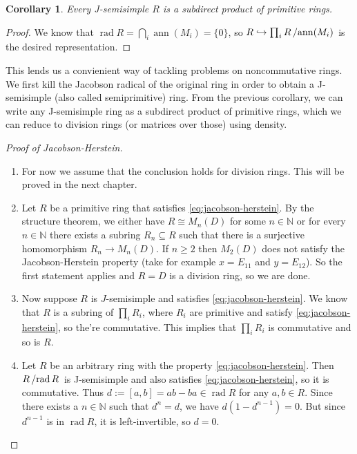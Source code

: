 \documentclass[10pt, a4paper]{article}
\newtheorem{corollary}[thm]{Corollary}
\newenvironment{noticeC}{%
  \tcolorbox[%
  notitle,
  empty,
  enhanced,  %
  breakable,
  coltext=black, 
  fontupper=\rmfamily,
  noparskip,
  sharp corners,
  boxrule=-1pt,  %
  frame hidden,
  left=7pt,  %
  right=7pt,
  top=5pt,
  bottom=5pt,
  before skip=2.5ex plus 2pt,
  after skip=2.5ex plus 2pt,
  overlay unbroken and last={%
  },
  ]}
{\endtcolorbox}
\newenvironment{myproof}%
  {\begin{noticeC}\begin{proof}}%
  {\end{proof}\end{noticeC}}
\newcommand{\N}{\mathbb {N}}
\newcommand{\quot}[2]{{\raisebox{0em}{$#1$}\left/\raisebox{0em}{$#2$}\right.}}
\DeclareMathOperator{\rad}{rad}
\DeclareMathOperator{\ann}{ann}
\begin{document}
\begin{corollary}
  Every J-semisimple $R$ is a subdirect product of primitive rings.
\end{corollary}

\begin{myproof}
  We know that $\rad R = \bigcap_{i} \ann (M_i) = \{0\}$, so $R \hookrightarrow \prod_i \quot{R}{\ann (M_i)}$
  is the desired representation.
\end{myproof}

This lends us a convienient way of tackling problems on noncommutative rings.
We first kill the Jacobson radical of the original ring in order to obtain a J-semisimple
(also called semiprimitive) ring. From the previous corollary, we can write any J-semisimple ring 
as a subdirect product of primitive rings, which we can reduce to division rings (or matrices over those) using density.

\begin{myproof}[Proof of Jacobson-Herstein]
  \begin{enumerate}
    \item For now we assume that the conclusion holds for division rings. This will be proved in the next chapter.
    \item Let $R$ be a primitive ring that satisfies \eqref{eq:jacobson-herstein}.
    By the structure theorem, we either have $R \cong M_n(D)$ for some $n \in \N$ or
    for every $n \in \N$ there exists a subring $R_n \subseteq R$
    such that there is a surjective homomorphism $R_n \to M_n (D)$.
    If $n \geq 2$ then $M_2 (D)$ does not satisfy the Jacobson-Herstein property (take for example $x = E_{11}$ and $y = E_{12}$).
    So the first statement applies and $R = D$ is a division ring, so we are done.
    \item Now suppose $R$ is $J$-semisimple and satisfies \eqref{eq:jacobson-herstein}.
    We know that $R$ is a subring of $\prod_i R_i$, where $R_i$ are primitive and satisfy \eqref{eq:jacobson-herstein},
    so the're commutative. This implies that $\prod_i R_i$ is commutative and so is $R$.
    \item Let $R$ be an arbitrary ring with the property \eqref{eq:jacobson-herstein}. Then $\quot{R}{\rad R}$
    is J-semisimple and also satisfies \eqref{eq:jacobson-herstein}, so it is commutative.
    Thus $d := [a, b] = ab - ba \in \rad R$ for any $a, b \in R$. Since there exists a $n \in \N$
    such that $d^n = d$, we have $d(1 - d^{n - 1}) = 0$. But since $d^{n - 1}$
    is in $\rad R$, it is left-invertible, so $d = 0$. \qedhere 
  \end{enumerate} 
\end{myproof}
\end{document}
